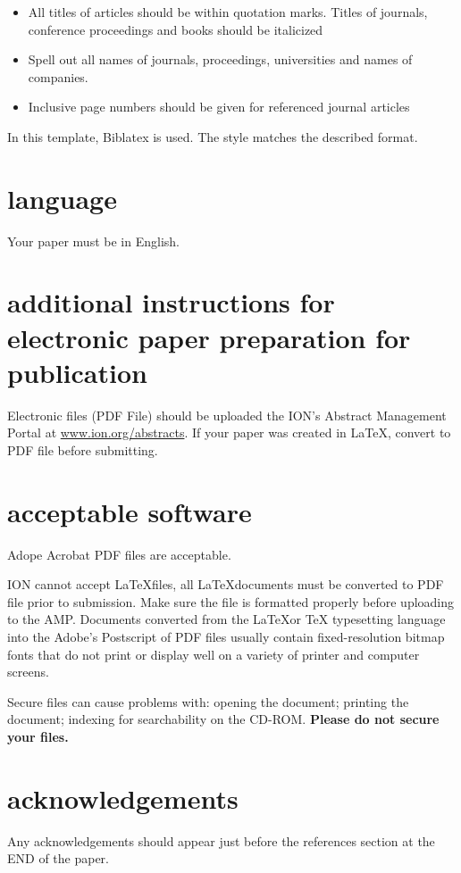\documentclass[letterpaper,times]{IONconf}
\begin{document}
\begin{itemize}
    \item All titles of articles should be within quotation marks. Titles of journals, conference proceedings and books should be italicized
    \item Spell out all names of journals, proceedings, universities and names of companies.
    \item Inclusive page numbers should be given for referenced journal articles
\end{itemize}

In this template, Biblatex is used. The style \verb|| matches the described format.


\section{language}

Your paper must be in English.

\section{additional instructions for electronic paper preparation for publication}

Electronic files (PDF File) should be uploaded the ION’s Abstract Management Portal at \url{www.ion.org/abstracts}. If your paper was created in \LaTeX, convert to PDF file before submitting.


\section{acceptable software}

Adope Acrobat PDF files are acceptable.

ION cannot accept \LaTeX files, all \LaTeX documents must be converted to PDF file prior to submission. Make sure the file is formatted properly before uploading to the AMP.  Documents converted from the \LaTeX or TeX typesetting language into the Adobe’s Postscript of PDF files usually contain fixed-resolution bitmap fonts that do not print or display well on a variety of printer and computer screens.  

Secure files can cause problems with: opening the document; printing the document; indexing for searchability on the CD-ROM. \textbf{\large{Please do not secure your files.}}


\section*{acknowledgements}

Any acknowledgements should appear just before the references section at the END of the paper.



\end{document}
